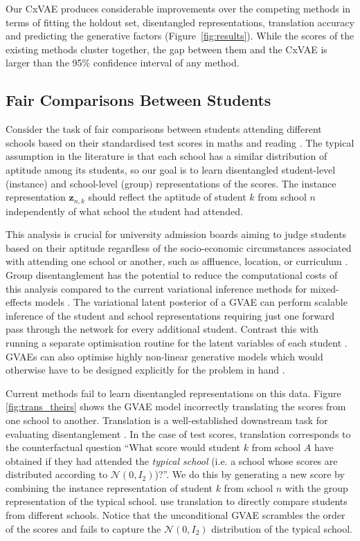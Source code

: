 \documentclass{article} %
\begin{document}
Our CxVAE produces considerable improvements over the competing methods in terms of fitting the holdout set, disentangled representations, translation accuracy and predicting the generative factors (Figure~\ref{fig:results}). While the scores of the existing methods cluster together, the gap between them and the CxVAE is larger than the 95\% confidence interval of any method.

\subsection{Fair Comparisons Between Students}

Consider the task of fair comparisons between students attending different schools based on their standardised test scores in maths and reading \citep{Braun2006ComparingPS}. The typical assumption in the literature is that each school has a similar distribution of aptitude among its students, so our goal is to learn disentangled student-level (instance) and school-level (group) representations of the scores. The instance representation $\mathbf{z}_{n,k}$ should reflect the aptitude of student $k$ from school $n$ independently of what school the student had attended.

This analysis is crucial for university admission boards aiming to judge students based on their aptitude regardless of the socio-economic circumstances associated with attending one school or another, such as affluence, location, or curriculum \citep{Raudenbush1995TheEO, Braun2006ComparingPS}. Group disentanglement has the potential to reduce the computational costs of this analysis compared to the current variational inference methods for mixed-effects models \citep{Gelman2006Data}. The variational latent posterior of a GVAE can perform scalable inference of the student and school representations requiring just one forward pass through the network for every additional student. Contrast this with running a separate optimisation routine for the latent variables of each student \citep{Gelman1995BayesianDA}. GVAEs can also optimise highly non-linear generative models which would otherwise have to be designed explicitly for the problem in hand \citep{Pinheiro2001MixedEffectsMI}.

Current methods fail to learn disentangled representations on this data. Figure \ref{fig:trans_theirs} shows the GVAE model \citep{Hosoya2019GroupbasedLO} incorrectly translating the scores from one school to another. Translation is a well-established downstream task for evaluating disentanglement \citep{Tenenbaum2000SeparatingSA}. In the case of test scores, translation corresponds to the counterfactual question ``What score would student $k$ from school $A$ have obtained if they had attended the \textit{typical school} (i.e. a school whose scores are distributed according to $\mathcal{N}(0,I_2)$)?''. We do this by generating a new score by combining the instance representation of student $k$ from school $n$ with the group representation of the typical school. \citet{Raudenbush1995TheEO} use translation to directly compare students from different schools. Notice that the unconditional GVAE scrambles the order of the scores and fails to capture the $\mathcal{N}(0,I_2)$ distribution of the typical school.
\end{document}
